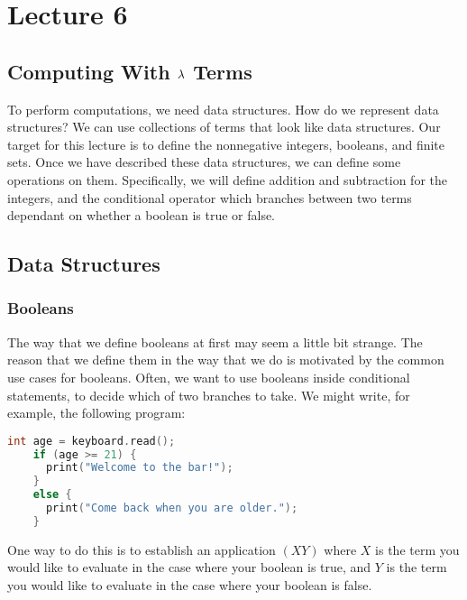 \chapter{Lecture 6}

\def\uwavy#1{#1}

\section{Computing With $\lambda$ Terms}
To perform computations, we need data structures. How do we represent data structures? We can use collections of terms that look like data structures. Our target for this lecture is to define the nonnegative integers, booleans, and finite sets. Once we have described these data structures, we can define some operations on them. Specifically, we will define addition and subtraction for the integers, and the conditional operator which branches between two terms dependant on whether a boolean is true or false.

\section{Data Structures}

\subsection{Booleans}
The way that we define booleans at first may seem a little bit strange. The reason that we define them in the way that we do is motivated by the common use cases for booleans. Often, we want to use booleans inside conditional statements, to decide which of two branches to take. We might write, for example, the following program:
\begin{center}
  \begin{lstlisting}[language=C,backgroundcolor=\color{txtbkpaleblue},showstringspaces=false]
    int age = keyboard.read();
    if (age >= 21) {
      print("Welcome to the bar!");
    }
    else {
      print("Come back when you are older.");
    }
  \end{lstlisting}
\end{center}

One way to do this is to establish an application $(XY)$ where $X$ is the term you would like to evaluate in the case where your boolean is true, and $Y$ is the term you would like to evaluate in the case where your boolean is false.\\

